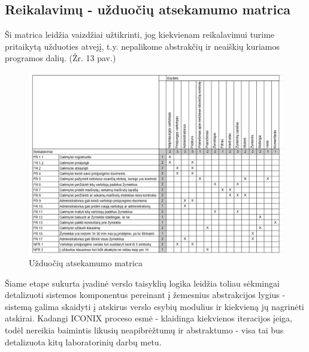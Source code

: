 \documentclass{VUMIFPSkursinis}
\begin{document}
\subsection{Reikalavimų - užduočių atsekamumo matrica}
Ši matrica leidžia vaizdžiai užtikrinti, jog kiekvienam reikalavimui turime pritaikytą užduoties atvejį, t.y. nepalikome abstrakčių ir neaiškių kuriamos programos dalių. (Žr. 13 pav.)
	\begin{figure}[H]
				\centering
				\includegraphics[scale=0.4]{img/uzduociu_matrica}
				\caption{Užduočių atsekamumo matrica}
				\label{img:matrix}
			\end{figure}
Šiame etape sukurta įvadinė verslo taisyklių logika leidžia toliau sėkmingai detalizuoti sistemos komponentus pereinant į žemesnius abstrakcijos lygius - sistemą galima skaidyti į atskirus verslo esybių modulius ir kiekvieną jų nagrinėti atskirai. Kadangi ICONIX proceso esmė - klaidinga kiekvienos iteracijos įeiga, todėl nereikia baimintis likusių neapibrėžtumų ir abstraktumo - visa tai bus detalizuota kitų laboratorinių darbų metu.

\end{document}
